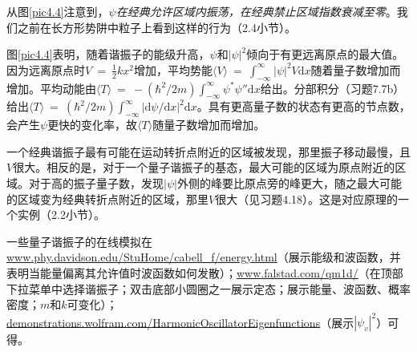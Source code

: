 \documentclass[12pt,a4paper,openany]{ctexbook}
\newcommand{\abs}[1]{\left| #1 \right|}
\newcommand{\ang}[1]{\langle #1 \rangle}
\newcommand{\dd}[1]{\mathrm{d} #1}
\begin{document}
\begin{flushleft}
从图\ref{pic4.4}注意到，\textit{$\psi$在经典允许区域内振荡，在经典禁止区域指数衰减至零}。我们之前在长方形势阱中粒子上看到这样的行为（2.4小节）。

图\ref{pic4.4}表明，随着谐振子的能级升高，$\psi$和$\abs{\psi}^2$倾向于有更远离原点的最大值。因为远离原点时$V\ =\ \frac{1}{2}kx^2$增加，平均势能$\ang{V}\ =\ \int_{-\infty}^{\infty}\abs{\psi}^2V\dd x$随着量子数增加而增加。平均动能由$\ang{T}\ =\ -(\hbar^2/2m)\int_{-\infty}^{\infty}\psi^*\psi''\dd x$给出。分部积分（习题7.7b）给出$\ang{T}\ =\ (\hbar^2/2m)\int_{-\infty}^{\infty}\abs{\dd \psi/\dd x}^2\dd x$。具有更高量子数的状态有更高的节点数，会产生$\psi$更快的变化率，故$\ang{T}$随量子数增加而增加。

一个经典谐振子最有可能在运动转折点附近的区域被发现，那里振子移动最慢，且$V$很大。相反的是，对于一个量子谐振子的基态，最大可能的区域为原点附近的区域。对于高的振子量子数，发现$\abs{\psi}$外侧的峰要比原点旁的峰更大，随之最大可能的区域变为经典转折点附近的区域，那里$V$很大（见习题4.18）。这是对应原理的一个实例（2.2小节）。

一些量子谐振子的在线模拟在\url{www.phy.davidson.edu/StuHome/cabell_f/energy.html}（展示能级和波函数，并表明当能量偏离其允许值时波函数如何发散）；\url{www.falstad.com/qm1d/}（在顶部下拉菜单中选择谐振子；双击底部小圆圈之一展示定态；展示能量、波函数、概率密度；$m$和$k$可变化）；\url{demonstrations.wolfram.com/HarmonicOscillatorEigenfunctions}（展示$\abs{\psi_v}^2$）可得。
\end{flushleft}
\end{document}
